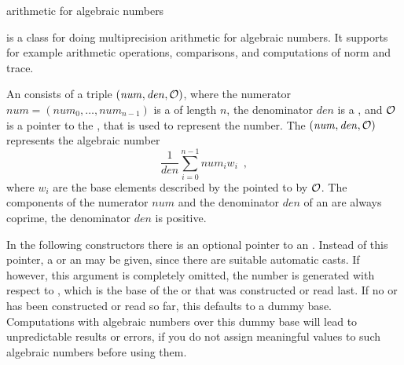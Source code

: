 
\newcommand{\num}{\mathit{num}}
\newcommand{\den}{\mathit{den}}



\NAME

 \dotfill arithmetic for algebraic numbers



\ABSTRACT

 is a class for doing multiprecision arithmetic for algebraic numbers.  It
supports for example arithmetic operations, comparisons, and computations of norm and trace.



\DESCRIPTION

An  consists of a triple $(\num, \den, \Or)$, where the numerator $\num =
(\num_0, \dots, \num_{n-1})$ is a  of length $n$, the denominator
$\den$ is a , and $\mathcal{O}$ is a pointer to the , that is used to
represent the number.  The  $(\num, \den, \Or)$ represents the algebraic number
\begin{displaymath}
  \frac{1}{\den} \sum_{i=0}^{n-1} \num_i w_i \enspace,
\end{displaymath}
where $w_i$ are the base elements described by the  pointed to by $\mathcal{O}$.  The
components of the numerator $\num$ and the denominator $\den$ of an  are always
coprime, the denominator $\den$ is positive.



\CONS

In the following constructors there is an optional pointer to an .  Instead of
this pointer, a  or an  may be given, since there are suitable
automatic casts.  If however, this argument is completely omitted, the number is generated with
respect to , which is the base of the  or
 that was constructed or read last.  If no  or  has
been constructed or read so far, this defaults to a dummy base.  Computations with algebraic
numbers over this dummy base will lead to unpredictable results or errors, if you do not assign
meaningful values to such algebraic numbers before using them.

